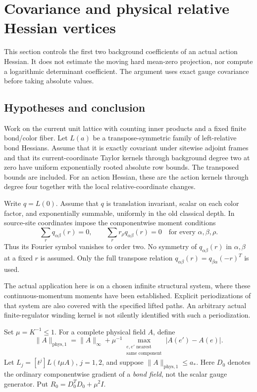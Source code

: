\section{Covariance and physical relative Hessian vertices}
\label{chr-section}

This section controls the first two background coefficients of an
actual action Hessian.  It does not estimate the moving hard
mean-zero projection, nor compute a logarithmic determinant
coefficient.  The argument uses exact gauge covariance before
taking absolute values.

\subsection{Hypotheses and conclusion}
\label{chr-hypotheses}

Work on the current unit lattice with counting inner products and a
fixed finite bond/color fiber.  Let \(L(a)\) be a transpose-symmetric
family of left-relative bond Hessians.  Assume that it is exactly
covariant under sitewise adjoint frames and that its current-coordinate
Taylor kernels through background degree two at zero have uniform
exponentially rooted absolute row bounds.  The transposed bounds are
included.  For an action Hessian, these are the action kernels through
degree four together with the local relative-coordinate changes.

Write \(q=L(0)\).  Assume that \(q\) is translation invariant, scalar
on each color factor, and exponentially summable, uniformly in the
old classical depth.  In source-site coordinates impose the
componentwise moment conditions
\begin{equation}
 \sum_r q_{\alpha\beta}(r)=0,\qquad
 \sum_r r_\rho q_{\alpha\beta}(r)=0
 \quad\text{for every }\alpha,\beta,\rho .
 \label{chr-moments}
\end{equation}
Thus its Fourier symbol vanishes to order two.  No symmetry of
\(q_{\alpha\beta}(r)\) in \(\alpha,\beta\) at a fixed \(r\) is assumed.
Only the full transpose relation
\(q_{\alpha\beta}(r)=q_{\beta\alpha}(-r)^T\) is used.

The actual application here is on a chosen infinite structural system,
where these continuous-momentum moments have been established.
Explicit periodizations of that system are also covered with the
specified lifted paths.  An arbitrary actual finite-regulator winding
kernel is not silently identified with such a periodization.

Set \(\mu=K^{-1}\leq1\).  For a complete physical field \(A\), define
\begin{equation}
 \|A\|_{\mathrm{phys},1}
 =\|A\|_\infty+
   \mu^{-1}\max_{\substack{e,e'\text{ nearest}\\
                          \text{same component}}}
                     |A(e')-A(e)| .
 \label{chr-physical-norm}
\end{equation}
Let \(L_j=[t^j]L(t\mu A)\), \(j=1,2\), and suppose
\(\|A\|_{\mathrm{phys},1}\leq a_*\).
Here \(D_0\) denotes the ordinary componentwise gradient of a
\emph{bond field}, not the scalar gauge generator.  Put
\(R_0=D_0^TD_0+\mu^2I\).

